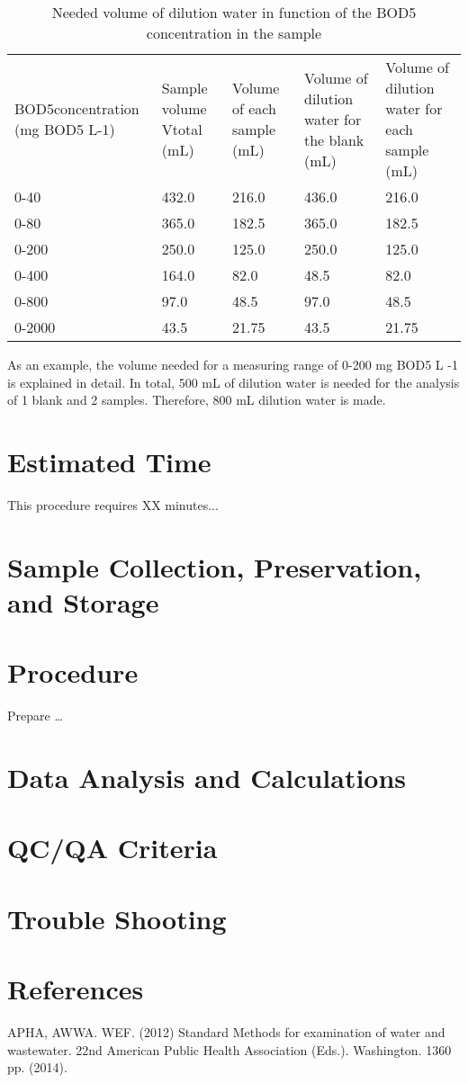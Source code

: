 \documentclass[12pt]{../SOP3_beta}
\begin{document}
\begin{table}
\begin{tabular}{lllll}
BOD5concentration (mg BOD5 L-1) & 
Sample volume Vtotal (mL) & Volume of each sample (mL) &
Volume of dilution water for the blank (mL) & Volume of dilution water for each sample (mL) \\
0-40 & 432.0 & 216.0 & 436.0 & 216.0\\
0-80 & 365.0 & 182.5 & 365.0 & 182.5 \\
0-200 & 250.0 & 125.0 & 250.0 & 125.0 \\
0-400 & 164.0 & 82.0 & 48.5 & 82.0 \\
0-800 & 97.0 & 48.5 & 97.0 & 48.5 \\
0-2000 & 43.5 &  21.75 & 43.5 & 21.75\\

\end{tabular}
\caption{Needed volume of dilution water in function of the BOD5 concentration in the sample}
\end{table}

As an example, the volume needed for a measuring range of 0-200 mg BOD5 L
-1
is explained in
detail. In total, 500 mL of dilution water is needed for the analysis of 1 blank and 2 samples. Therefore,
800 mL dilution water is made. 

\section{Estimated Time}

\NP This procedure requires XX minutes...

\section{Sample Collection, Preservation, and Storage}

\section{Procedure}

\NP Prepare \dots

\NP

\section{Data Analysis and Calculations}

\section{QC/QA Criteria}

\section{Trouble Shooting}

\section{References}

\NP APHA, AWWA. WEF. (2012) Standard Methods for examination of water and wastewater. 22nd American Public Health Association (Eds.). Washington. 1360 pp. (2014).
\end{document}
